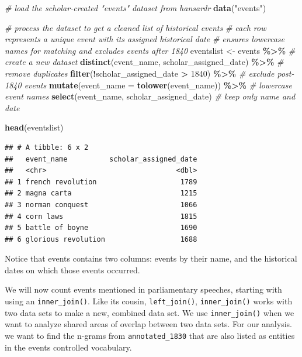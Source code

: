 \documentclass[
]{article}
\newenvironment{Shaded}{\begin{snugshade}}{\end{snugshade}}
\newcommand{\AttributeTok}[1]{\textcolor[rgb]{0.13,0.29,0.53}{#1}}
\newcommand{\CommentTok}[1]{\textcolor[rgb]{0.56,0.35,0.01}{\textit{#1}}}
\newcommand{\DecValTok}[1]{\textcolor[rgb]{0.00,0.00,0.81}{#1}}
\newcommand{\FunctionTok}[1]{\textcolor[rgb]{0.13,0.29,0.53}{\textbf{#1}}}
\newcommand{\NormalTok}[1]{#1}
\newcommand{\OtherTok}[1]{\textcolor[rgb]{0.56,0.35,0.01}{#1}}
\newcommand{\SpecialCharTok}[1]{\textcolor[rgb]{0.81,0.36,0.00}{\textbf{#1}}}
\newcommand{\StringTok}[1]{\textcolor[rgb]{0.31,0.60,0.02}{#1}}
\begin{document}
\begin{Shaded}
\begin{Highlighting}[]
\CommentTok{\# load the scholar{-}created "events" dataset from hansardr}
\FunctionTok{data}\NormalTok{(}\StringTok{"events"}\NormalTok{)}

\CommentTok{\# process the dataset to get a cleaned list of historical events}
\CommentTok{\# each row represents a unique event with its assigned historical date}
\CommentTok{\# ensures lowercase names for matching and excludes events after 1840}
\NormalTok{eventslist }\OtherTok{\textless{}{-}}\NormalTok{ events }\SpecialCharTok{\%\textgreater{}\%} \CommentTok{\# create a new dataset}
  \FunctionTok{distinct}\NormalTok{(event\_name, scholar\_assigned\_date) }\SpecialCharTok{\%\textgreater{}\%} \CommentTok{\# remove duplicates}
  \FunctionTok{filter}\NormalTok{(}\SpecialCharTok{!}\NormalTok{scholar\_assigned\_date }\SpecialCharTok{\textgreater{}} \DecValTok{1840}\NormalTok{) }\SpecialCharTok{\%\textgreater{}\%} \CommentTok{\# exclude post{-}1840 events}
  \FunctionTok{mutate}\NormalTok{(}\AttributeTok{event\_name =} \FunctionTok{tolower}\NormalTok{(event\_name)) }\SpecialCharTok{\%\textgreater{}\%} \CommentTok{\# lowercase event names}
  \FunctionTok{select}\NormalTok{(event\_name, scholar\_assigned\_date) }\CommentTok{\# keep only name and date}

\FunctionTok{head}\NormalTok{(eventslist)}
\end{Highlighting}
\end{Shaded}

\begin{verbatim}
## # A tibble: 6 x 2
##   event_name          scholar_assigned_date
##   <chr>                               <dbl>
## 1 french revolution                    1789
## 2 magna carta                          1215
## 3 norman conquest                      1066
## 4 corn laws                            1815
## 5 battle of boyne                      1690
## 6 glorious revolution                  1688
\end{verbatim}

Notice that events contains two columns: events by their name, and the
historical dates on which those events occurred.

We will now count events mentioned in parliamentary speeches, starting
with using an \texttt{inner\_join()}. Like its cousin,
\texttt{left\_join()}, \texttt{inner\_join()} works with two data sets
to make a new, combined data set. We use \texttt{inner\_join()} when we
want to analyze shared areas of overlap between two data sets. For our
analysis. we want to find the n-grams from \texttt{annotated\_1830} that
are also listed as entities in the events controlled vocabulary.
\end{document}
